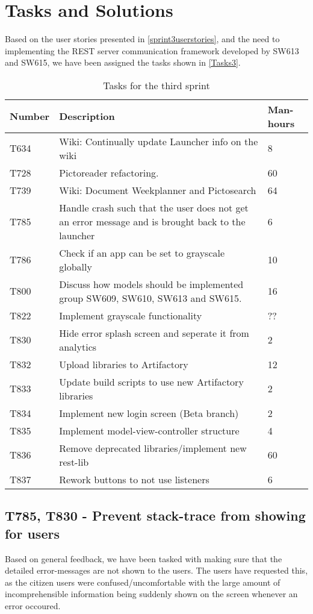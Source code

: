 \section{Tasks and Solutions}
Based on the user stories presented in \autoref{sprint3userstories}, and the
need to implementing the REST server communication framework developed by SW613 and SW615, we have
been assigned the tasks shown in \autoref{Tasks3}.

\begin{table}[H]
\begin{centering}
\begin{tabular}{|l|p{9cm}|l|}
\hline
Number 	& Description & Man-hours \\ \hline
T634   	& Wiki: Continually update Launcher info on the wiki & 8\\\hline
T728  	& Pictoreader refactoring. & 60 \\ \hline
T739	& Wiki: Document Weekplanner and Pictosearch & 64\\ \hline
T785	& Handle crash such that the user does not get an error message and is
		  brought back to the launcher & 6\\ \hline
T786 	& Check if an app can be set to grayscale globally & 10\\ \hline
T800 	& Discuss how models should be implemented group SW609, SW610, SW613 and
		  SW615. & 16\\ \hline
T822 	& Implement grayscale functionality & ??\\ \hline
T830 	& Hide error splash screen and seperate it from analytics & 2\\ \hline
T832 	& Upload libraries to Artifactory & 12\\ \hline
T833 	& Update build scripts to use new Artifactory libraries & 2\\ \hline
T834 	& Implement new login screen (Beta branch) & 2\\ \hline
T835 	& Implement model-view-controller structure & 4\\ \hline
T836 	& Remove deprecated libraries/implement new rest-lib & 60\\ \hline
T837 	& Rework buttons to not use listeners & 6\\ \hline
\end{tabular}
\caption{Tasks for the third sprint}
\label{Tasks3}
\end{centering}
\end{table}

\subsection{T785, T830 - Prevent stack-trace from showing for users}
Based on general feedback, we have been tasked with making sure that the
detailed error-messages are not shown to the users. The users have requested
this, as the citizen users were confused/uncomfortable with the large amount of
incomprehensible information being suddenly shown on the screen whenever an
error occoured.\nl

